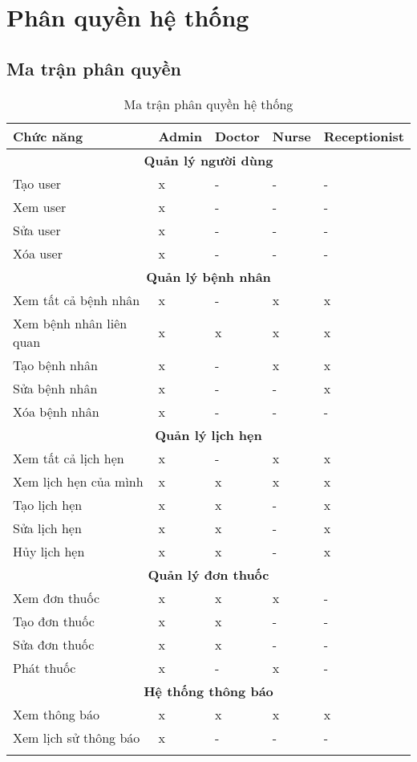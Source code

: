 \documentclass[12pt,a4paper]{report}
\begin{document}
    \chapter{Phân quyền hệ thống}

    \section{Ma trận phân quyền}

    \begin{longtable}{|p{3cm}|p{2cm}|p{2cm}|p{2cm}|p{2cm}|}
    \hline
    \textbf{Chức năng} & \textbf{Admin} & \textbf{Doctor} & \textbf{Nurse} & \textbf{Receptionist} \\
    \hline
    \multicolumn{5}{|c|}{\textbf{Quản lý người dùng}} \\
    \hline
    Tạo user & x & - & - & - \\
    \hline
    Xem user & x & - & - & - \\
    \hline
    Sửa user & x & - & - & - \\
    \hline
    Xóa user & x & - & - & - \\
    \hline
    \multicolumn{5}{|c|}{\textbf{Quản lý bệnh nhân}} \\
    \hline
    Xem tất cả bệnh nhân & x & - & x & x \\
    \hline
    Xem bệnh nhân liên quan & x & x & x & x \\
    \hline
    Tạo bệnh nhân & x & - & x & x \\
    \hline
    Sửa bệnh nhân & x & - & - & x \\
    \hline
    Xóa bệnh nhân & x & - & - & - \\
    \hline
    \multicolumn{5}{|c|}{\textbf{Quản lý lịch hẹn}} \\
    \hline
    Xem tất cả lịch hẹn & x & - & x & x \\
    \hline
    Xem lịch hẹn của mình & x & x & x & x \\
    \hline
    Tạo lịch hẹn & x & x & - & x \\
    \hline
    Sửa lịch hẹn & x & x & - & x \\
    \hline
    Hủy lịch hẹn & x & x & - & x \\
    \hline
    \multicolumn{5}{|c|}{\textbf{Quản lý đơn thuốc}} \\
    \hline
    Xem đơn thuốc & x & x & x & - \\
    \hline
    Tạo đơn thuốc & x & x & - & - \\
    \hline
    Sửa đơn thuốc & x & x & - & - \\
    \hline
    Phát thuốc & x & - & x & - \\
    \hline
    \multicolumn{5}{|c|}{\textbf{Hệ thống thông báo}} \\
    \hline
    Xem thông báo & x & x & x & x \\
    \hline
    Xem lịch sử thông báo & x & - & - & - \\
    \hline
    \caption{Ma trận phân quyền hệ thống}
    \end{longtable}
\end{document}
